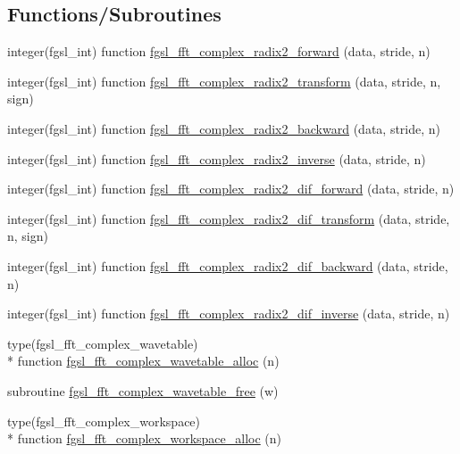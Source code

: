 \subsection*{Functions/\-Subroutines}
\begin{DoxyCompactItemize}
\item 
integer(fgsl\-\_\-int) function \hyperlink{fft_8finc_a6d6765aceb1cb89aa378e657277cb60e}{fgsl\-\_\-fft\-\_\-complex\-\_\-radix2\-\_\-forward} (data, stride, n)
\item 
integer(fgsl\-\_\-int) function \hyperlink{fft_8finc_adb683798dd4ccce52cc209e16deac0ab}{fgsl\-\_\-fft\-\_\-complex\-\_\-radix2\-\_\-transform} (data, stride, n, sign)
\item 
integer(fgsl\-\_\-int) function \hyperlink{fft_8finc_ac9dfd334102aed6b1833e9b6b936ee38}{fgsl\-\_\-fft\-\_\-complex\-\_\-radix2\-\_\-backward} (data, stride, n)
\item 
integer(fgsl\-\_\-int) function \hyperlink{fft_8finc_a2976591bd53bebb217c69c16b9cb36b4}{fgsl\-\_\-fft\-\_\-complex\-\_\-radix2\-\_\-inverse} (data, stride, n)
\item 
integer(fgsl\-\_\-int) function \hyperlink{fft_8finc_ab346147a5eba7237163db01403bd96e7}{fgsl\-\_\-fft\-\_\-complex\-\_\-radix2\-\_\-dif\-\_\-forward} (data, stride, n)
\item 
integer(fgsl\-\_\-int) function \hyperlink{fft_8finc_ae161490fa787f0b7b2d7aae171abb2fe}{fgsl\-\_\-fft\-\_\-complex\-\_\-radix2\-\_\-dif\-\_\-transform} (data, stride, n, sign)
\item 
integer(fgsl\-\_\-int) function \hyperlink{fft_8finc_a288d6bc95e5d5a7c2d0c0787ed77493a}{fgsl\-\_\-fft\-\_\-complex\-\_\-radix2\-\_\-dif\-\_\-backward} (data, stride, n)
\item 
integer(fgsl\-\_\-int) function \hyperlink{fft_8finc_aa5abc4b2da983c0197e3612ca15f700b}{fgsl\-\_\-fft\-\_\-complex\-\_\-radix2\-\_\-dif\-\_\-inverse} (data, stride, n)
\item 
type(fgsl\-\_\-fft\-\_\-complex\-\_\-wavetable) \\*
function \hyperlink{fft_8finc_afd1a11147328bddf936a7d414f796490}{fgsl\-\_\-fft\-\_\-complex\-\_\-wavetable\-\_\-alloc} (n)
\item 
subroutine \hyperlink{fft_8finc_a8b3b35a0490b49010d2f096a2117e1b0}{fgsl\-\_\-fft\-\_\-complex\-\_\-wavetable\-\_\-free} (w)
\item 
type(fgsl\-\_\-fft\-\_\-complex\-\_\-workspace) \\*
function \hyperlink{fft_8finc_a1ab14d22f845afbded031591ff898b56}{fgsl\-\_\-fft\-\_\-complex\-\_\-workspace\-\_\-alloc} (n)

\end{DoxyCompactItemize}

